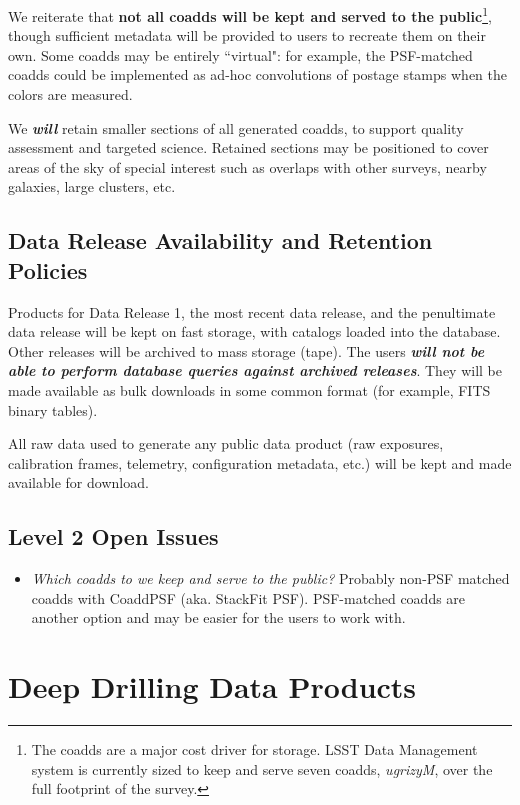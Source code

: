 \documentclass[12pt]{article}
\begin{document}
\vspace{1ex}

We reiterate that {\bf not all coadds will be kept and served to the public}\footnote{The coadds are a major cost driver for storage. LSST Data Management system is currently sized to keep and serve seven coadds, {\em ugrizyM}, over the full footprint of the survey.}, though sufficient metadata will be provided to users to recreate them on their own. Some coadds may be entirely ``virtual": for example, the PSF-matched coadds could be implemented as ad-hoc convolutions of postage stamps when the colors are measured.

We {\em \bf will} retain smaller sections of all generated coadds, to support quality assessment and targeted science. Retained sections may be positioned to cover areas of the sky of special interest such as overlaps with other surveys, nearby galaxies, large clusters, etc.

\subsection{Data Release Availability and Retention Policies}

Products for Data Release 1, the most recent data release, and the penultimate data release will be kept on fast storage, with catalogs loaded into the database. Other releases will be archived to mass storage (tape). The users {\bf \em will not be able to perform database queries against archived releases}. They will be made available as bulk downloads in some common format (for example, FITS binary tables).

All raw data used to generate any public data product (raw exposures, calibration frames, telemetry, configuration metadata, etc.) will be kept and made available for download.

\subsection{Level 2 Open Issues}

\begin{itemize}
    \item {\em Which coadds to we keep and serve to the public?} Probably non-PSF matched coadds with CoaddPSF (aka. StackFit PSF). PSF-matched coadds are another option and may be easier for the users to work with.
\end{itemize}

\section{Deep Drilling Data Products}
\end{document}
